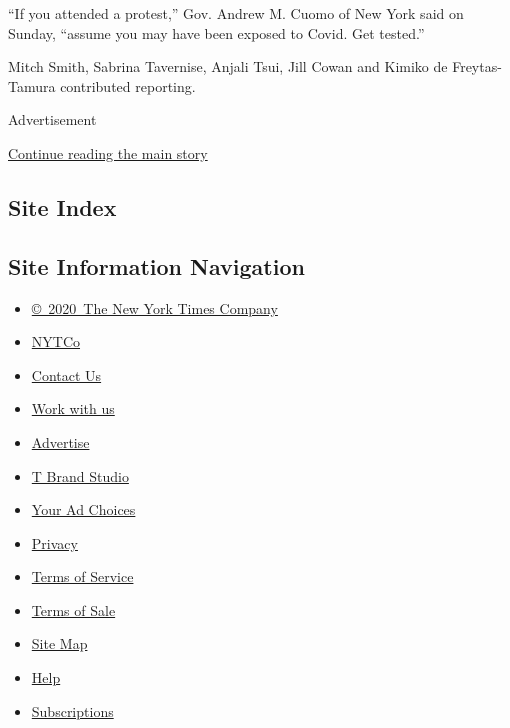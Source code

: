 ``If you attended a protest,'' Gov. Andrew M. Cuomo of New York said on
Sunday, ``assume you may have been exposed to Covid. Get tested.''

Mitch Smith, Sabrina Tavernise, Anjali Tsui, Jill Cowan and Kimiko de
Freytas-Tamura contributed reporting.

Advertisement

\protect\hyperlink{after-bottom}{Continue reading the main story}

\hypertarget{site-index}{%
\subsection{Site Index}\label{site-index}}

\hypertarget{site-information-navigation}{%
\subsection{Site Information
Navigation}\label{site-information-navigation}}

\begin{itemize}
\tightlist
\item
  \href{https://help.nytimes3xbfgragh.onion/hc/en-us/articles/115014792127-Copyright-notice}{©~2020~The
  New York Times Company}
\end{itemize}

\begin{itemize}
\tightlist
\item
  \href{https://www.nytco.com/}{NYTCo}
\item
  \href{https://help.nytimes3xbfgragh.onion/hc/en-us/articles/115015385887-Contact-Us}{Contact
  Us}
\item
  \href{https://www.nytco.com/careers/}{Work with us}
\item
  \href{https://nytmediakit.com/}{Advertise}
\item
  \href{http://www.tbrandstudio.com/}{T Brand Studio}
\item
  \href{https://www.nytimes3xbfgragh.onion/privacy/cookie-policy\#how-do-i-manage-trackers}{Your
  Ad Choices}
\item
  \href{https://www.nytimes3xbfgragh.onion/privacy}{Privacy}
\item
  \href{https://help.nytimes3xbfgragh.onion/hc/en-us/articles/115014893428-Terms-of-service}{Terms
  of Service}
\item
  \href{https://help.nytimes3xbfgragh.onion/hc/en-us/articles/115014893968-Terms-of-sale}{Terms
  of Sale}
\item
  \href{https://spiderbites.nytimes3xbfgragh.onion}{Site Map}
\item
  \href{https://help.nytimes3xbfgragh.onion/hc/en-us}{Help}
\item
  \href{https://www.nytimes3xbfgragh.onion/subscription?campaignId=37WXW}{Subscriptions}
\end{itemize}
